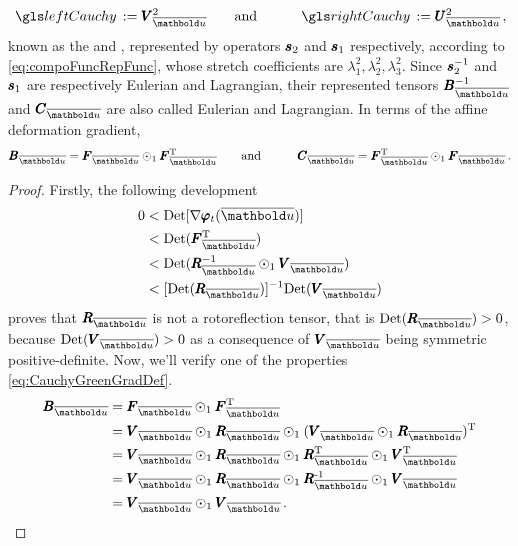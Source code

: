 \begin{alignat}{3} 
\gloref{leftCauchy}:=\tnr{V}_{\overline{\vto{u}}}^2&\qquad \text{and}\qquad & \gloref{rightCauchy}:=\tnr{U}_{\overline{\vto{u}}}^2\,,
\end{alignat}
known as the  and , represented by operators $\pmb{s}_2$ and $\pmb{s}_1$ respectively, according to \eqref{eq:compoFuncRepFunc}, whose stretch coefficients are $\lambda_1^2,\lambda_2^2,\lambda_3^2$. Since $\pmb{s}_2^{-1}$ and $\pmb{s}_1$ are respectively Eulerian and Lagrangian, their represented tensors $\tnr{B}_{\overline{\vto{u}}}^{-1}$ and $\tnr{C}_{\overline{\vto{u}}}$ are also called  Eulerian and Lagrangian. In terms of the affine deformation gradient,
\begin{alignat}{3}\label{eq:CauchyGreenGradDef}
\tnr{B}_{\overline{\vto{u}}}=\tnr{F}_{\overline{\vto{u}}}\odot_1\tnr{F}_{\overline{\vto{u}}}^\text{T}&\qquad \text{and}\qquad & \tnr{C}_{\overline{\vto{u}}}=\tnr{F}_{\overline{\vto{u}}}^\text{T}\odot_1\tnr{F}_{\overline{\vto{u}}}\,.
\end{alignat}


{\footnotesize
\begin{proof}
Firstly, the following development 
\begin{align*}
0&<\textnormal{Det}[\fua{\nabla\tnr{\varphi}_t}{\overline{\vto{u}}}]\\ 
&< \textnormal{Det}(\tnr{F}_{\overline{\vto{u}}}^\text{T})\\
&< \textnormal{Det}(\tnr{R}_{\overline{\vto{u}}}^{-1}\odot_1\tnr{V}_{\overline{\vto{u}}})\\
&< [\textnormal{Det}(\tnr{R}_{\overline{\vto{u}}})]^{-1}\textnormal{Det}(\tnr{V}_{\overline{\vto{u}}})
\end{align*}
proves that $\tnr{R}_{\overline{\vto{u}}}$ is not a rotoreflection tensor, that is $\textnormal{Det}(\tnr{R}_{\overline{\vto{u}}})>0$, because $\textnormal{Det}(\tnr{V}_{\overline{\vto{u}}})>0$ as a consequence of $\tnr{V}_{\overline{\vto{u}}}$ being symmetric positive-definite. Now, we'll verify one of the properties \eqref{eq:CauchyGreenGradDef}. 
\begin{align*}
\tnr{B}_{\overline{\vto{u}}}&=\tnr{F}_{\overline{\vto{u}}}\odot_1\tnr{F}_{\overline{\vto{u}}}^\text{T}\\
&=\tnr{V}_{\overline{\vto{u}}}\odot_1\tnr{R}_{\overline{\vto{u}}}\odot_1(\tnr{V}_{\overline{\vto{u}}}\odot_1\tnr{R}_{\overline{\vto{u}}})^\text{T}\\
&=\tnr{V}_{\overline{\vto{u}}}\odot_1\tnr{R}_{\overline{\vto{u}}}\odot_1\tnr{R}_{\overline{\vto{u}}}^\text{T}\odot_1\tnr{V}_{\overline{\vto{u}}}^\text{T}\\
&=\tnr{V}_{\overline{\vto{u}}}\odot_1\tnr{R}_{\overline{\vto{u}}}\odot_1\tnr{R}_{\overline{\vto{u}}}^\text{-1}\odot_1\tnr{V}_{\overline{\vto{u}}}\\
&=\tnr{V}_{\overline{\vto{u}}}\odot_1\tnr{V}_{\overline{\vto{u}}}\,.
\end{align*}
\end{proof}
}

